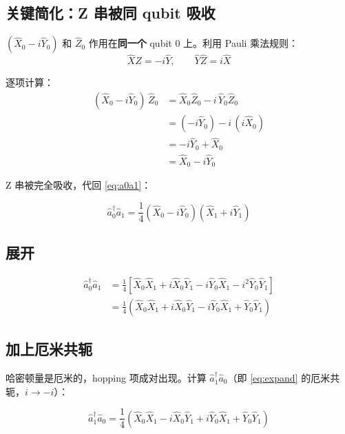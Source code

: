 \documentclass[11pt,a4paper]{article}
\begin{document}
\subsection{关键简化：Z 串被同 qubit 吸收}

$(\hat{X}_0 - i\hat{Y}_0)$ 和 $\hat{Z}_0$ 作用在\textbf{同一个} qubit 0 上。利用 Pauli 乘法规则：
\begin{equation}
  \hat{X}\hat{Z} = -i\hat{Y}, \qquad \hat{Y}\hat{Z} = i\hat{X}
\end{equation}

逐项计算：
\begin{align}
  (\hat{X}_0 - i\hat{Y}_0)\,\hat{Z}_0
  &= \hat{X}_0\hat{Z}_0 - i\,\hat{Y}_0\hat{Z}_0 \\
  &= (-i\hat{Y}_0) - i\,(i\hat{X}_0) \\
  &= -i\hat{Y}_0 + \hat{X}_0 \\
  &= \hat{X}_0 - i\hat{Y}_0
\end{align}

Z 串被完全吸收，代回 \eqref{eq:a0a1}：

\begin{equation}
  \hat{a}_0^\dagger \hat{a}_1
  = \frac{1}{4}(\hat{X}_0 - i\hat{Y}_0)(\hat{X}_1 + i\hat{Y}_1)
\end{equation}

\subsection{展开}

\begin{align}
  \hat{a}_0^\dagger \hat{a}_1
  &= \frac{1}{4}\left[\hat{X}_0\hat{X}_1 + i\hat{X}_0\hat{Y}_1 - i\hat{Y}_0\hat{X}_1 - i^2\hat{Y}_0\hat{Y}_1\right] \\
  &= \frac{1}{4}\left(\hat{X}_0\hat{X}_1 + i\hat{X}_0\hat{Y}_1 - i\hat{Y}_0\hat{X}_1 + \hat{Y}_0\hat{Y}_1\right)
  \label{eq:expand}
\end{align}

\subsection{加上厄米共轭}

哈密顿量是厄米的，hopping 项成对出现。计算 $\hat{a}_1^\dagger \hat{a}_0$（即 \eqref{eq:expand} 的厄米共轭，$i \to -i$）：

\begin{equation}
  \hat{a}_1^\dagger \hat{a}_0
  = \frac{1}{4}\left(\hat{X}_0\hat{X}_1 - i\hat{X}_0\hat{Y}_1 + i\hat{Y}_0\hat{X}_1 + \hat{Y}_0\hat{Y}_1\right)
\end{equation}
\end{document}
